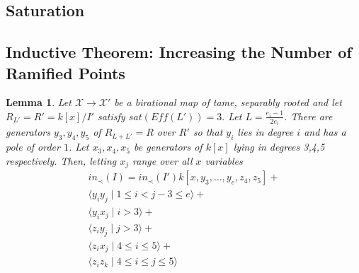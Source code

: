 \documentclass{amsart}
\theoremstyle{plain}
\newtheorem{lem}[thm]{Lemma}
\theoremstyle{definition}
\theoremstyle{remark}
\numberwithin{equation}{section}
\newcommand\ssec{\subsection}
\newcommand \sx{\mathscr X}
\newcommand \halfcan{L}
\newcommand \subhalf[1]{\frac{e_{#1} - 1}{2e_{#1}}}
\begin{document}
\ssec{Saturation}
\label{ssec:g_0_saturation}

\ssec{Inductive Theorem: Increasing the Number of Ramified Points}
\label{ssec:g_0_ram_pts}


\begin{lem}
\label{sat_three_induction}
Let $\sx \rightarrow \sx'$ be a birational map of tame, separably rooted  and let $R_{\halfcan'} = R' = k[x]/I'$ satisfy $sat(Eff(\halfcan')) = 3.$ Let $\halfcan = \subhalf i$. There are generators $y_3,y_4,y_5$ of $R_{\halfcan+\halfcan'}= R$ over $R'$ so that $y_i$ lies in degree $i$ and has a pole of order $1$.  
Let $x_3,x_4,x_5$ be generators of $k[x]$ lying in degrees 3,4,5 respectively.  Then, letting $x_j$ range over all $x$ variables
\begin{align*}
	in_\prec(I) = in_\prec(I')k[x,y_3,\ldots, y_e,z_4,z_5] + \\
	\langle y_i y_j \mid 1 \leq i < j-3 \leq e \rangle +\\
	\langle y_i x_j \mid i > 3 \rangle +\\
	\langle z_i y_j \mid j > 3 \rangle  +\\
	\langle z_i x_j \mid 4 \leq i \leq 5\rangle + \\
	\langle z_iz_k \mid 4 \leq i \leq j \leq 5 \rangle 
\end{align*}

\end{lem}
\end{document}
